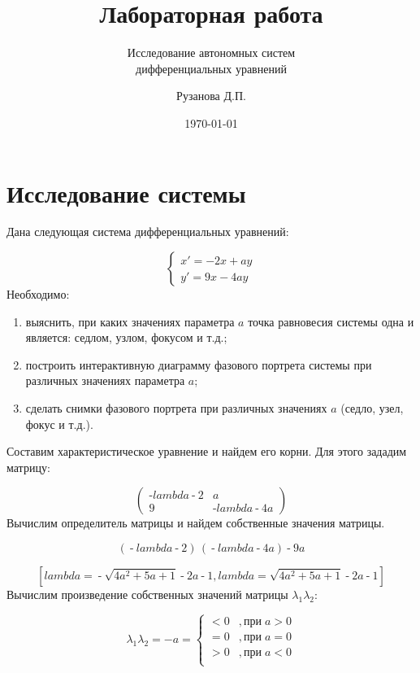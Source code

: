 \documentclass[c]{beamer}
\title{Лабораторная работа}
\subtitle{Исследование автономных систем\\
дифференциальных уравнений}
\author{Рузанова Д.П.}
\date{\today}
\institute[ОмГУ]{Омский государственный университет \\ им. Ф.М. Достоевского}
\begin{document}
\frame[plain]{\titlepage}	%
\section{Исследование системы}

Дана следующая система дифференциальных
уравнений:

$$\begin{cases}
    x' = -2x + ay \\
    y' = 9x - 4ay
\end{cases}$$
Необходимо:
\begin{enumerate}
    \item выяснить, при каких значениях параметра $a$ точка равновесия системы одна и является: седлом, узлом, фокусом и т.д.;
    \item построить интерактивную диаграмму фазового портрета системы при различных значениях параметра $a$;
    \item сделать снимки фазового портрета при различных значениях $a$ (седло, узел, фокус и т.д.).
\end{enumerate}
\newpage
\noindent

Составим характеристическое уравнение и найдем его корни. Для этого зададим матрицу:

\[\displaystyle \tag{matrix} 
\begin{pmatrix}\operatorname{-}lambda\operatorname{-}2 & a\\
9 & \operatorname{-}lambda\operatorname{-}4 a\end{pmatrix}\mbox{}
\]
Вычислим определитель матрицы и найдем
собственные значения матрицы.

\[\displaystyle \tag{d} 
\left( \operatorname{-}lambda\operatorname{-}2\right) \, \left( \operatorname{-}lambda\operatorname{-}4 a\right) \operatorname{-}9 a\mbox{}
\]




\[\displaystyle 
\operatorname{[}lambda\operatorname{=}\operatorname{-}\sqrt{4 {{a}^{2}}\operatorname{+}5 a\operatorname{+}1}\operatorname{-}2 a\operatorname{-}1\operatorname{,}lambda\operatorname{=}\sqrt{4 {{a}^{2}}\operatorname{+}5 a\operatorname{+}1}\operatorname{-}2 a\operatorname{-}1\operatorname{]}\mbox{}
\]
\newpage
Вычислим произведение собственных значений матрицы $\lambda_1 \lambda_2$:


$$
   \lambda_1 \lambda_2=-a=	\left\{
		\begin{aligned}
		     <0 &, \text{при} \; a>0 \\ 
		   =0 &, \text{при} \; a = 0 \\
              >0 &, \text{при} \; a < 0 \\
		\end{aligned}
	\right.
$$ 
\end{document}
